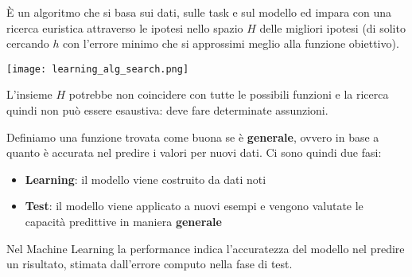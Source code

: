 \begin{definition}
	È un algoritmo che si basa sui dati, sulle task e sul modello ed impara con una ricerca euristica attraverso le ipotesi nello spazio $H$ delle migliori ipotesi (di solito cercando $h$ con l'errore minimo che si approssimi meglio alla funzione obiettivo).
	\begin{center}
		\texttt{[image: learning\_alg\_search.png]}
	\end{center}
\end{definition}

\begin{note}
	L'insieme $H$ potrebbe non coincidere con tutte le possibili funzioni e la ricerca quindi non può essere esaustiva: deve fare determinate assunzioni.
\end{note}

\begin{definition}
	Definiamo una funzione trovata come buona se è \textbf{generale}, ovvero in base a quanto è accurata nel predire i valori per nuovi dati. Ci sono quindi due fasi:
	\begin{itemize}
		\item \textbf{Learning}: il modello viene costruito da dati noti
		\item \textbf{Test}: il modello viene applicato a nuovi esempi e vengono valutate le capacità predittive in maniera \textbf{generale}
	\end{itemize}
\end{definition}
\begin{note}[Performance]
	Nel Machine Learning la performance indica l'accuratezza del modello nel predire un risultato, stimata dall'errore computo nella fase di test.
\end{note}

